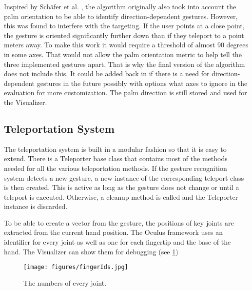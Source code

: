 Inspired by Schäfer et al. \cite{Schafer2021}, the algorithm originally also took into account the palm orientation to be able to identify direction-dependent gestures. However, this was found to interfere with the targeting. If the user points at a close point, the gesture is oriented significantly further down than if they teleport to a point meters away. To make this work it would require a threshold of almost 90 degrees in some axes. That would not allow the palm orientation metric to help tell the three implemented gestures apart. That is why the final version of the algorithm does not include this. It could be added back in if there is a need for direction-dependent gestures in the future possibly with options what axes to ignore in the evaluation for more customization. The palm direction is still stored and used for the Visualizer.

\subsection{Teleportation System}
The teleportation system is built in a modular fashion so that it is easy to extend. There is a Teleporter base class that contains most of the methods needed for all the various teleportation methods. If the gesture recognition system detects a new gesture, a new instance of the corresponding teleport class is then created. This is active as long as the gesture does not change or until a teleport is executed. Otherwise, a cleanup method is called and the Teleporter instance is discarded. 

To be able to create a vector from the gesture, the positions of key joints are extracted from the current hand position. The Oculus framework uses an identifier for every joint as well as one for each fingertip and the base of the hand. The Visualizer can show them for debugging (see \ref{fig:fingerIds})

\begin{figure}[!ht]
    \centering
    \texttt{[image: figures/fingerIds.jpg]}
    \caption{The numbers of every joint.}
    \label{fig:fingerIds}
\end{figure}

